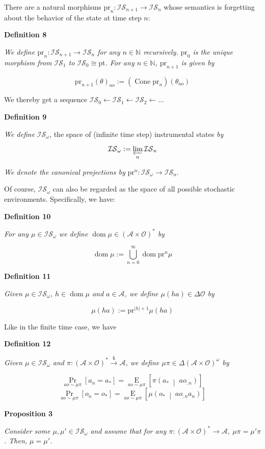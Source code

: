 \documentclass[a4paper]{article}
\newcommand{\Co}[1]{}
\DeclareMathOperator{\Dom}{dom}
\newcommand{\AP}[1]{\left(#1\right)}
\newcommand{\AB}[1]{\left[#1\right]}
\newcommand{\APM}[2]{\left(#1\;\middle\vert\;#2\right)}
\newcommand{\Pa}[2]{\underset{#1}{\operatorname{Pr}}\AB{#2}}
\newcommand{\Ea}[2]{\underset{#1}{\operatorname{E}}\AB{#2}}
\newcommand{\Nats}{\mathbb{N}}
\newcommand{\Pt}{\boldsymbol{\mathrm{pt}}}
\newcommand{\Abs}[1]{\left\vert #1 \right\vert}
\newcommand{\K}{\xrightarrow{\mathrm{k}}}
\newcommand{\A}{\mathcal{A}}
\newcommand{\Ob}{\mathcal{O}}
\newcommand{\AO}{\AP{\A\times\Ob}}
\newcommand{\FH}{\AO^*}
\DeclareMathOperator{\Cone}{Cone}
\newcommand{\IS}{\mathcal{IS}}
\newcommand{\Prj}{\mathrm{pr}}
\begin{document}
There are a natural morphisms $\Prj_n:\IS_{n+1}\rightarrow\IS_n$ whose semantics is forgetting about the behavior of the state at time step $n$:

\textbf{Definition 8}\Co{b}

\textit{We define $\Prj_n:\IS_{n+1}\rightarrow\IS_n$ for any $n\in\Nats$ recursively. $\Prj_0$ is the unique morphism from $\IS_1$ to $\IS_0\cong\Pt$. For any $n\in\Nats$, $\Prj_{n+1}$ is given by}\Co{i}

$$\Prj_{n+1}(\theta)_{ao}:=\AP{\Cone{\Prj_n}}\AP{\theta_{ao}}$$

We thereby get a sequence $\IS_0 \leftarrow \IS_1 \leftarrow \IS_2 \leftarrow \ldots$

\textbf{Definition 9}\Co{b}

\textit{We define}\Co{i} $\IS_\omega$, the space of (infinite time step) instrumental states \textit{by}\Co{i}

$$\IS_\omega:=\varprojlim_n \IS_n$$

\textit{We denote the canonical projections by}\Co{i} $\Prj^n:\IS_\omega\rightarrow\IS_n$.

Of course, $\IS_\omega$ can also be regarded as the space of all possible stochastic environments. Specifically, we have:

\textbf{Definition 10}\Co{b}

\textit{For any $\mu\in\IS_\omega$ we define $\Dom\mu\in\FH$ by}\Co{i}

$$\Dom\mu:=\bigcup_{n=0}^\infty \Dom\Prj^n\mu$$

\textbf{Definition 11}\Co{b}

\textit{Given $\mu\in\IS_\omega$, $h\in\Dom\mu$ and $a\in\A$, we define $\mu(ha)\in\Delta\Ob$ by}\Co{i}

$$\mu(ha):=\Prj^{\Abs{h}+1}\mu(ha)$$

Like in the finite time case, we have

\textbf{Definition 12}\Co{b}

\textit{Given $\mu\in\IS_\omega$ and $\pi:\FH\K\A$, we define $\mu\pi\in\Delta\AO^\omega$ by}\Co{i}

$$\Pa{ao\sim\mu\pi}{a_n=a_*}=\Ea{ao\sim\mu\pi}{\pi\APM{a_*}{ao_{:n}}}$$
$$\Pa{ao\sim\mu\pi}{o_n=o_*}=\Ea{ao\sim\mu\pi}{\mu\APM{o_*}{ao_{:n}a_n}}$$

\textbf{Proposition 3}\Co{b}

\textit{Consider some $\mu,\mu'\in\IS_\omega$ and assume that for any $\pi:\FH\rightarrow\A$, $\mu\pi=\mu'\pi$. Then, $\mu=\mu'$.}\Co{i}
\end{document}
